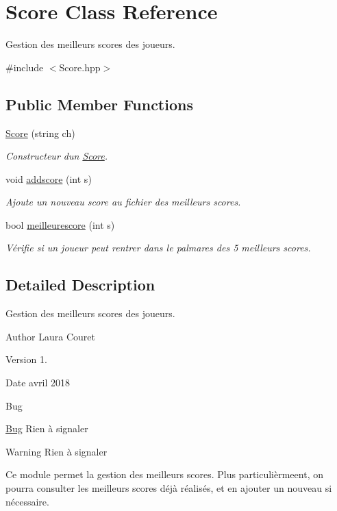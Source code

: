 \hypertarget{classScore}{}\section{Score Class Reference}
\label{classScore}


Gestion des meilleurs scores des joueurs.  




{\ttfamily \#include $<$Score.\+hpp$>$}

\subsection*{Public Member Functions}
\begin{DoxyCompactItemize}
\item 
\hyperlink{classScore_a93772a8d3e8c9f71cd3e4a0bf74d9e78}{Score} (string ch)
\begin{DoxyCompactList}\small\item\em Constructeur d\textquotesingle{}un \hyperlink{classScore}{Score}. \end{DoxyCompactList}\item 
void \hyperlink{classScore_a6575097aed9e43ec2b8c5926e00134c1}{addscore} (int s)
\begin{DoxyCompactList}\small\item\em Ajoute un nouveau score au fichier des meilleurs scores. \end{DoxyCompactList}\item 
bool \hyperlink{classScore_aed385c5969860d59ca1477e2699c2f54}{meilleurescore} (int s)
\begin{DoxyCompactList}\small\item\em Vérifie si un joueur peut rentrer dans le palmares des 5 meilleurs scores. \end{DoxyCompactList}\end{DoxyCompactItemize}


\subsection{Detailed Description}
Gestion des meilleurs scores des joueurs. 

\begin{DoxyAuthor}{Author}
Laura Couret 
\end{DoxyAuthor}
\begin{DoxyVersion}{Version}
1. 
\end{DoxyVersion}
\begin{DoxyDate}{Date}
avril 2018 
\end{DoxyDate}
\begin{DoxyRefDesc}{Bug}
\item[\hyperlink{bug__bug000016}{Bug}]Rien à signaler \end{DoxyRefDesc}
\begin{DoxyWarning}{Warning}
Rien à signaler
\end{DoxyWarning}
Ce module permet la gestion des meilleurs scores. Plus particulièrmeent, on pourra consulter les meilleurs scores déjà réalisés, et en ajouter un nouveau si nécessaire. 

